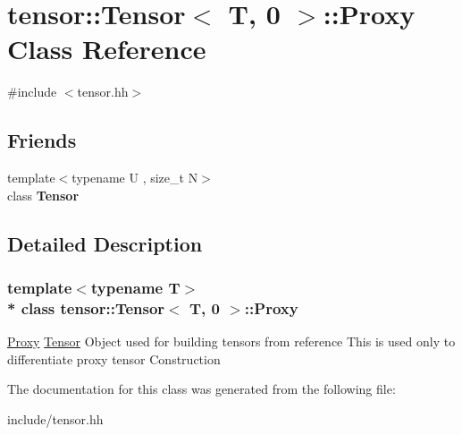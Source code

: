 \hypertarget{classtensor_1_1Tensor_3_01T_00_010_01_4_1_1Proxy}{}\section{tensor\+:\+:Tensor$<$ T, 0 $>$\+:\+:Proxy Class Reference}
\label{classtensor_1_1Tensor_3_01T_00_010_01_4_1_1Proxy}


{\ttfamily \#include $<$tensor.\+hh$>$}

\subsection*{Friends}
\begin{DoxyCompactItemize}
\item 
{\footnotesize template$<$typename U , size\+\_\+t N$>$ }\\class {\bfseries Tensor}\hypertarget{classtensor_1_1Tensor_3_01T_00_010_01_4_1_1Proxy_af4a07134de1525172d3c60c57e8f1496}{}\label{classtensor_1_1Tensor_3_01T_00_010_01_4_1_1Proxy_af4a07134de1525172d3c60c57e8f1496}

\end{DoxyCompactItemize}


\subsection{Detailed Description}
\subsubsection*{template$<$typename T$>$\\*
class tensor\+::\+Tensor$<$ T, 0 $>$\+::\+Proxy}

\hyperlink{classtensor_1_1Tensor_3_01T_00_010_01_4_1_1Proxy}{Proxy} \hyperlink{classtensor_1_1Tensor}{Tensor} Object used for building tensors from reference This is used only to differentiate proxy tensor Construction 

The documentation for this class was generated from the following file\+:\begin{DoxyCompactItemize}
\item 
include/tensor.\+hh\end{DoxyCompactItemize}
